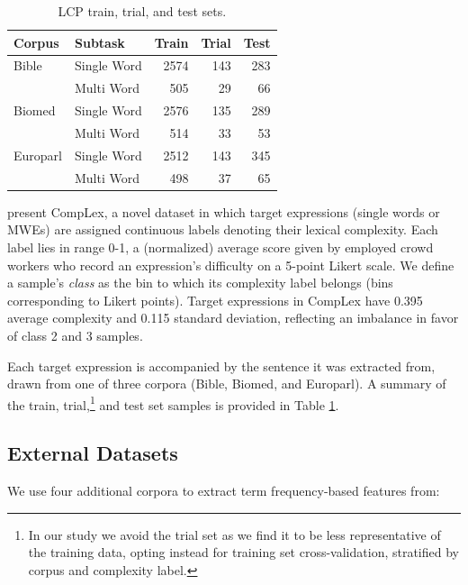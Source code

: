 \documentclass[11pt,a4paper]{article}
\begin{document}
\begin{table}
  \centering
  \begin{tabular}{l|l|r|r|r}
    \toprule
    \centering
    Corpus & Subtask & Train &  Trial &  Test \\
    \midrule
    Bible & Single Word &   2574 &    143 &   283 \\
            & Multi Word &    505 &     29 &    66 \\
    \midrule
    Biomed & Single Word &   2576 &    135 &   289 \\
            & Multi Word &    514 &     33 &    53 \\
    \midrule
    Europarl & Single Word &   2512 &    143 &   345 \\
            & Multi Word &    498 &     37 &    65 \\
    \bottomrule
  \end{tabular}
  \caption{\label{tab:datasets} LCP train, trial, and test sets.}
\end{table}

\citet{shardlow2020complex} present CompLex, a novel dataset in which target expressions (single words or MWEs) are assigned continuous labels denoting their lexical complexity. Each label lies in range 0-1, a (normalized) average score given by employed crowd workers who record an expression's difficulty on a 5-point Likert scale. We define a sample's \textit{class} as the bin to which its complexity label belongs (bins corresponding to Likert points). Target expressions in CompLex have 0.395 average complexity and 0.115 standard deviation, reflecting an imbalance in favor of class 2 and 3 samples. 

Each target expression is accompanied by the sentence it was extracted from, drawn from one of three corpora (Bible, Biomed, and Europarl). A summary of the train, trial,\footnote{In our study we avoid the trial set as we find it to be less representative of the training data, opting instead for training set cross-validation, stratified by corpus and complexity label.} and test set samples is provided in Table \ref{tab:datasets}.

\subsection{External Datasets}

We use four additional corpora to extract term frequency-based features from:
\end{document}

